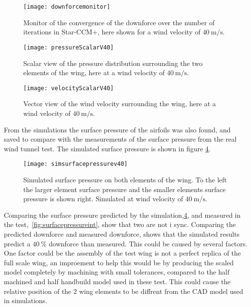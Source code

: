   \begin{figure}
    \texttt{[image: downforcemonitor]}
    \caption{Monitor of the convergence of the downforce over the number of iterations in Star-CCM+, here shown for a wind velocity of $\SI{40}{\metre\per\second}$.}
    \label{fig:downforcemonitor}
  \end{figure}

  \begin{figure}
    \texttt{[image: pressureScalarV40]}
    \caption{Scalar view of the pressure distribution surrounding the two elements of the wing, here at a wind velocity of $\SI{40}{\metre\per\second}$.}
    \label{fig:pressureScalarV40}
  \end{figure}

  \begin{figure}
    \texttt{[image: velocityScalarV40]}
    \caption{Vector view of the wind velocity surrounding the wing, here at a wind velocity of $\SI{40}{\metre\per\second}$.}
    \label{fig:velocityScalarV40}
  \end{figure}

  From the simulations the surface pressure of the airfoils was also found, and saved to compare with the measurements of the surface pressure from the real wind tunnel test. The simulated surface pressure is shown in figure \ref{fig:simsurfacepressurev40}.

  \begin{figure}
    \texttt{[image: simsurfacepressurev40]}
    \caption{Simulated surface pressure on both elements of the wing. To the left the larger element surface pressure and the smaller elements surface pressure is shown right. Simulated at wind velocity of $\SI{40}{\metre\per\second}$.}
    \label{fig:simsurfacepressurev40}
  \end{figure}

  Comparing the surface pressure predicted by the simulation,\ref{fig:simsurfacepressurev40}, and measured in the test, \ref{fig:surfacepressureint}, show that two are not i sync. Comparing the predicted downforce and measured downforce, shows that the simulated results predict a $\SI{40}{\%}$ downforce than measured. This could be caused by several factors. One factor could be the assembly of the test wing is not a perfect replica of the full scale wing, an improement to help this would be by producing the scaled model completely by machining with small tolerances, compared to the half machined and half handbuild model used in these test. This could cause the relative position of the 2 wing elements to be diffrent from the CAD model used in simulations.

